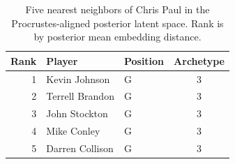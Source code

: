 \begin{table}[htbp]
  \centering\small
  \begin{tabular}{rllc}
    \toprule
    Rank & Player & Position & Archetype \\
    \midrule
    1 & Kevin Johnson & G & 3 \\
    2 & Terrell Brandon & G & 3 \\
    3 & John Stockton & G & 3 \\
    4 & Mike Conley & G & 3 \\
    5 & Darren Collison & G & 3 \\
    \bottomrule
  \end{tabular}
  \caption{Five nearest neighbors of Chris Paul in the Procrustes-aligned posterior latent space. Rank is by posterior mean embedding distance.}
  \label{tab:Chris_Paul_neighbors}
\end{table}


